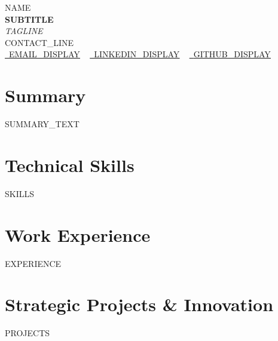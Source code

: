 \documentclass[letterpaper,11pt]{article}
\newcommand{\resumeSubHeadingListStart}{\begin{itemize}[leftmargin=0.0in, label={}]}
\newcommand{\resumeSubHeadingListEnd}{\end{itemize}}
\begin{document}
    \begin{center}
        {\Huge\scshape {{NAME}}} \\ \vspace{4pt}
        {\Large\textbf{{{SUBTITLE}}}} \\ \vspace{2pt}
        {\small\textit{{{TAGLINE}}}} \\ \vspace{4pt}
        {{CONTACT_LINE}}\\
        \small
        \href{mailto:{{EMAIL_URL}}}{\raisebox{-0.2\height}\faEnvelope\  \underline{{{EMAIL_DISPLAY}}}} ~
        \href{{{LINKEDIN_URL}}}{\raisebox{-0.2\height}\faLinkedin\ \underline{{{LINKEDIN_DISPLAY}}}}  ~
        \href{{{GITHUB_URL}}}{\raisebox{-0.2\height}\faGithub\ \underline{{{GITHUB_DISPLAY}}}}
    \end{center}

\section{Summary}
  \vspace{2pt}
  \small{{{SUMMARY_TEXT}}}
  \vspace{4pt}

\section{Technical Skills}
\vspace{-7pt}
\begin{itemize}
[leftmargin=0.15in, label={}]\small{\item{
{{SKILLS}}
}}
\end{itemize}

\section{Work Experience}
  \resumeSubHeadingListStart
{{EXPERIENCE}}
  \resumeSubHeadingListEnd

\section{Strategic Projects \& Innovation}
\resumeSubHeadingListStart
{{PROJECTS}}
\resumeSubHeadingListEnd
\end{document}
